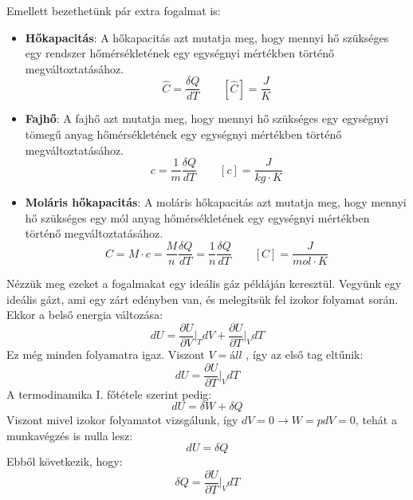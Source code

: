 \documentclass[../main.tex]{subfiles}
\begin{document}
Emellett bezethetünk pár extra fogalmat is:
\begin{itemize}
    \item \textbf{Hőkapacitás}: A hőkapacitás azt mutatja meg, hogy mennyi hő szükséges egy rendszer hőmérsékletének egy egységnyi mértékben történő megváltoztatásához.
    \begin{equation}
        \hat{C} = \frac{\delta Q}{dT} \qquad \left[\hat{C}\right] = \frac{J}{K}
    \end{equation}
    \item \textbf{Fajhő}: A fajhő azt mutatja meg, hogy mennyi hő szükséges egy egységnyi tömegű anyag hőmérsékletének egy egységnyi mértékben történő megváltoztatásához.
    \begin{equation}
        c = \frac{1}{m} \frac{\delta Q}{dT} \qquad \left[c\right] = \frac{J}{kg \cdot K}
    \end{equation}
    \item \textbf{Moláris hőkapacitás}: A moláris hőkapacitás azt mutatja meg, hogy mennyi hő szükséges egy mól anyag hőmérsékletének egy egységnyi mértékben történő megváltoztatásához.
    \begin{equation}
        C = M \cdot c = \frac{M}{n} \frac{\delta Q}{dT} = \frac{1}{n} \frac{\delta Q}{dT} \qquad \left[C\right] = \frac{J}{mol \cdot K}
    \end{equation}
\end{itemize}
Nézzük meg ezeket a fogalmakat egy ideális gáz példáján keresztül. Vegyünk egy ideális gázt, ami egy zárt edényben van, és melegítsük fel izokor folyamat során.
Ekkor a belső energia változása:
\begin{equation}
    dU = \frac{\partial U}{\partial V}\bigg|_{T} dV + \frac{\partial U}{\partial T}\bigg|_{V} dT
\end{equation}
Ez még minden folyamatra igaz. Viszont $V = áll$ , így az első tag eltűnik: 
\begin{equation}
    dU = \frac{\partial U}{\partial T}\bigg|_{V} dT
\end{equation}
A termodinamika I. főtétele szerint pedig:
\begin{equation}
    dU = \delta W + \delta Q
\end{equation}
Viszont mivel izokor folyamatot vizsgálunk, így $dV = 0 \to W = pdV = 0$, tehát a munkavégzés is nulla lesz:
\begin{equation}
    dU = \delta Q
\end{equation}
Ebből következik, hogy:
\begin{equation}
    \delta Q = \frac{\partial U}{\partial T}\bigg|_{V} dT
\end{equation}
\end{document}
